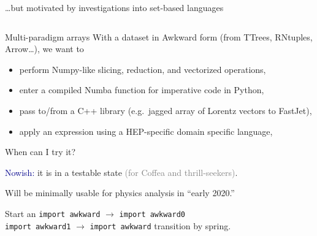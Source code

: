 \documentclass[aspectratio=169]{beamer}
\begin{document}
\begin{frame}[fragile]{\ldots but motivated by investigations into set-based languages}
\begin{columns}
\large
{}
\end{columns}
\end{frame}

\begin{frame}{Multi-paradigm arrays}
\large
\vspace{0.75 cm}
With a dataset in Awkward form (from TTrees, RNtuples, Arrow\ldots), we want to

\vspace{0.25 cm}
\begin{itemize}\setlength{\itemsep}{0.25 cm}
\item<2-> perform Numpy-like slicing, reduction, and vectorized operations,
\item<3-> enter a compiled Numba function for imperative code in Python,
\item<4-> pass to/from a C++ library (e.g.\ jagged array of Lorentz vectors to FastJet),
\item<5-> apply an expression using a HEP-specific domain specific language,
\end{itemize}

\vspace{0.25 cm}

\vspace{0.5 cm}
\begin{center}
\end{center}
\end{frame}

\begin{frame}{When can I try it?}
\Large
\begin{center}
\textcolor{darkblue}{Nowish:} it is in a testable state \textcolor{gray}{(for Coffea and thrill-seekers)}.

\vspace{1 cm}
Will be minimally usable for physics analysis in ``early 2020.''

\vspace{1 cm}
\end{center}

Start an {\normalsize \texttt{import awkward}} $\to$ {\normalsize \texttt{import awkward0}} \\
\phantom{Start an} {\normalsize \texttt{import awkward1}} $\to$ {\normalsize \texttt{import awkward}} transition by spring.
\end{frame}
\end{document}
